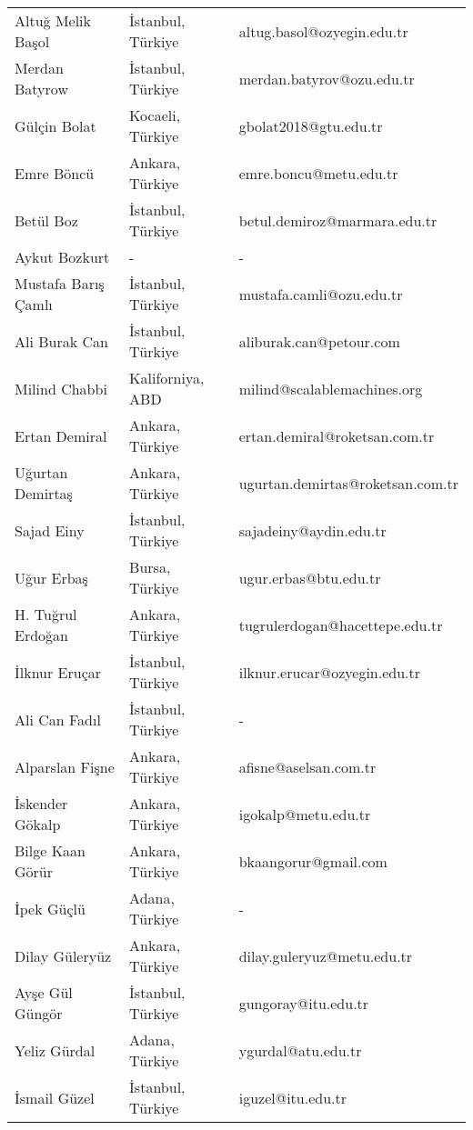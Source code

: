 {\begin{longtable}[c]{@{}lll@{}}
Altuğ Melik Başol & İstanbul, Türkiye & altug.basol@ozyegin.edu.tr \\
\rowcolor[HTML]{C0C0C0} 
Merdan Batyrow & İstanbul, Türkiye & merdan.batyrov@ozu.edu.tr \\
Gülçin Bolat & Kocaeli, Türkiye & gbolat2018@gtu.edu.tr \\
\rowcolor[HTML]{C0C0C0} 
Emre Böncü & Ankara, Türkiye & emre.boncu@metu.edu.tr \\
Betül Boz & İstanbul, Türkiye & betul.demiroz@marmara.edu.tr \\
\rowcolor[HTML]{C0C0C0} 
Aykut Bozkurt & - & - \\
Mustafa Barış Çamlı & İstanbul, Türkiye & mustafa.camli@ozu.edu.tr \\
\rowcolor[HTML]{C0C0C0} 
Ali Burak Can & İstanbul, Türkiye & aliburak.can@petour.com \\
Milind Chabbi & Kaliforniya, ABD & milind@scalablemachines.org \\
\rowcolor[HTML]{C0C0C0} 
Ertan Demiral & Ankara, Türkiye & ertan.demiral@roketsan.com.tr \\
Uğurtan Demirtaş & Ankara, Türkiye & ugurtan.demirtas@roketsan.com.tr \\
\rowcolor[HTML]{C0C0C0} 
Sajad Einy & İstanbul, Türkiye & sajadeiny@aydin.edu.tr \\
Uğur Erbaş & Bursa, Türkiye & ugur.erbas@btu.edu.tr \\
\rowcolor[HTML]{C0C0C0} 
H. Tuğrul Erdoğan & Ankara, Türkiye & tugrulerdogan@hacettepe.edu.tr \\
İlknur Eruçar & İstanbul, Türkiye & ilknur.erucar@ozyegin.edu.tr \\
\rowcolor[HTML]{C0C0C0} 
Ali Can Fadıl & İstanbul, Türkiye & - \\
Alparslan Fişne & Ankara, Türkiye & afisne@aselsan.com.tr \\
\rowcolor[HTML]{C0C0C0} 
İskender Gökalp & Ankara, Türkiye & igokalp@metu.edu.tr \\
Bilge Kaan Görür & Ankara, Türkiye & bkaangorur@gmail.com \\
\rowcolor[HTML]{C0C0C0} 
İpek Güçlü & Adana, Türkiye & - \\
Dilay Güleryüz & Ankara, Türkiye & dilay.guleryuz@metu.edu.tr \\
\rowcolor[HTML]{C0C0C0} 
Ayşe Gül Güngör & İstanbul, Türkiye & gungoray@itu.edu.tr \\
Yeliz Gürdal & Adana, Türkiye & ygurdal@atu.edu.tr \\
\rowcolor[HTML]{C0C0C0} 
İsmail Güzel & İstanbul, Türkiye & iguzel@itu.edu.tr \\

\end{longtable}}
